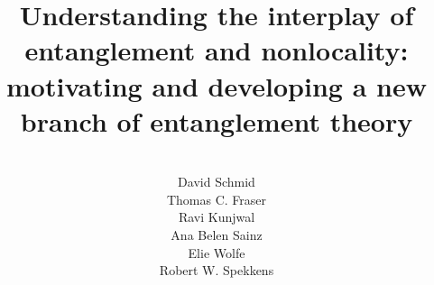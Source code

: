 \documentclass[12pt]{article}
\theoremstyle{plain}
\theoremstyle{definition}
\begin{document}
\title{Understanding the interplay of entanglement and nonlocality: %
motivating and developing a new branch of entanglement theory}

\author{{~~} \\David Schmid \\ Thomas C. Fraser \\ Ravi Kunjwal \\ Ana Belen Sainz \\ Elie Wolfe \\ Robert W. Spekkens}
\end{document}
